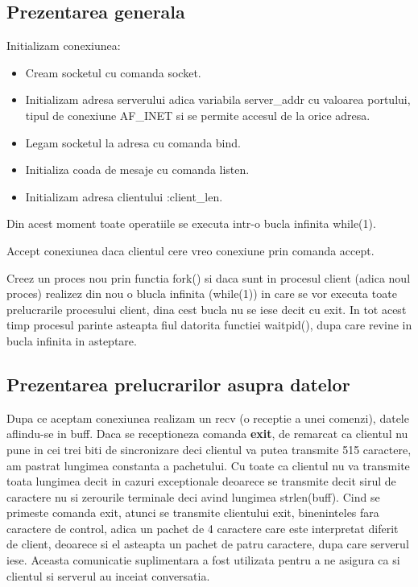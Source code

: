 \documentclass{report}
\begin{document}
\subsection{Prezentarea generala}

\hspace{5mm}Initializam conexiunea:

\begin{itemize}
\item  Cream socketul cu comanda socket.

\item  Initializam adresa serverului adica variabila server\_addr cu
valoarea portului, tipul de conexiune AF\_INET si se permite accesul de la
orice adresa.

\item  Legam socketul la adresa cu comanda bind.

\item  Initializa coada de mesaje cu comanda listen.

\item  Initializam adresa clientului :client\_len.
\end{itemize}

Din acest moment toate operatiile se executa intr-o bucla infinita while(1).

Accept conexiunea daca clientul cere vreo conexiune prin comanda accept.

Creez un proces nou prin functia fork() si daca sunt in procesul client
(adica noul proces) realizez din nou o blucla infinita (while(1)) in care se
vor executa toate prelucrarile procesului client, dina cest bucla nu se iese
decit cu exit. In tot acest timp procesul parinte asteapta fiul datorita
functiei waitpid(), dupa care revine in bucla infinita in asteptare.

\subsection{Prezentarea prelucrarilor asupra datelor}

\hspace{5mm}Dupa ce aceptam conexiunea realizam un recv (o receptie a unei
comenzi), datele aflindu-se in buff. Daca se receptioneza comanda \textbf{%
exit},  de remarcat ca clientul nu pune in cei trei biti de sincronizare
deci clientul va putea transmite 515 caractere, am pastrat lungimea
constanta a pachetului. Cu toate ca clientul nu va transmite toata lungimea
decit in cazuri exceptionale deoarece se transmite decit sirul de caractere
nu si zerourile terminale deci avind lungimea strlen(buff). Cind se primeste
comanda exit, atunci se transmite clientului exit, bineninteles fara
caractere de control, adica un pachet de 4 caractere care este interpretat
diferit de client, deoarece si el asteapta un pachet de patru caractere,
dupa care serverul iese. Aceasta comunicatie suplimentara a fost utilizata
pentru a ne asigura ca si clientul si serverul au inceiat conversatia.
\end{document}
